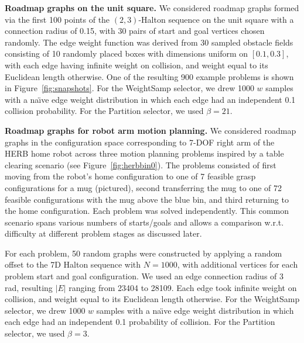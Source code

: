 \textbf{Roadmap graphs on the unit square.}
We considered roadmap graphs formed via the first 100 points
of the $(2,3)$-Halton sequence on the unit square
with a connection radius of 0.15,
with 30 pairs of start and goal vertices chosen randomly.
The edge weight function was derived from 30 sampled obstacle fields
consisting of 10 randomly placed boxes
with dimensions uniform on $[0.1,0.3]$,
with each edge having infinite weight on collision,
and weight equal to its Euclidean length otherwise.
One of the resulting 900 example problems is shown in
Figure~\ref{fig:snapshots}.
For the WeightSamp selector,
we drew 1000 $w$ samples
with a na\"{\i}ve edge weight distribution in which
each edge had an independent 0.1 collision probability.
For the Partition selector, we used $\beta = 21$.

\textbf{Roadmap graphs for robot arm motion planning.}
We considered roadmap graphs in the configuration space
corresponding to 7-DOF right arm of the HERB home robot across three
motion planning problems inspired by a table clearing scenario
(see Figure~\ref{fig:herbbin0}).
The problems consisted of first moving from the robot's
home configuration to one of 7 feasible grasp configurations for a mug
(pictured),
second transferring the mug to one of 72 feasible configurations with
the mug above the blue bin,
and third returning to the home configuration.
Each problem was solved independently.
This common scenario spans various numbers of starts/goals
and allows a comparison w.r.t. difficulty at different problem
stages as discussed later.

For each problem,
50 random graphs were constructed by applying a random offset to
the 7D Halton sequence with $N = 1000$,
with additional vertices for each problem start and goal configuration.
We used an edge connection radius of 3 rad,
resulting $|E|$ ranging from 23404 to 28109.
Each edge took infinite weight on collision,
and weight equal to its Euclidean length otherwise.
For the WeightSamp selector,
we drew 1000 $w$ samples
with a na\"{\i}ve edge weight distribution in which
each edge had an independent 0.1 probability of collision.
For the Partition selector, we used $\beta = 3$.

